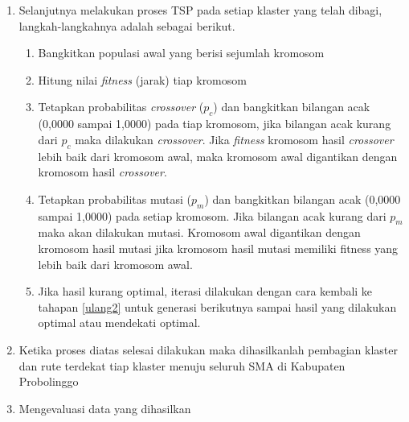 \begin{enumerate}
	\item Selanjutnya melakukan proses TSP pada setiap klaster yang telah dibagi, langkah-langkahnya adalah sebagai berikut.
	\begin{enumerate}
		\item Bangkitkan populasi awal yang berisi sejumlah kromosom
	    \item \label{ulang2} Hitung nilai \textit{fitness} (jarak) tiap kromosom
	    \item Tetapkan probabilitas \textit{crossover} ($p_c$) dan bangkitkan bilangan acak (0,0000 sampai 1,0000) pada tiap kromosom, jika bilangan acak kurang dari $p_c$ maka dilakukan \textit{crossover}. Jika \textit{fitness} kromosom hasil \textit{crossover} lebih baik dari kromosom awal, maka kromosom awal digantikan dengan kromosom hasil \textit{crossover}.
	    \item Tetapkan probabilitas mutasi ($p_m$) dan bangkitkan bilangan acak (0,0000 sampai 1,0000) pada setiap kromosom. Jika bilangan acak kurang dari $p_m$ maka akan dilakukan mutasi. Kromosom awal digantikan dengan kromosom hasil mutasi jika kromosom hasil mutasi memiliki fitness yang lebih baik dari kromosom awal.
	    \item Jika hasil kurang optimal, iterasi dilakukan dengan cara kembali ke tahapan \ref{ulang2} untuk generasi berikutnya sampai hasil yang dilakukan optimal atau mendekati optimal.
    \end{enumerate}
	\item Ketika proses diatas selesai dilakukan maka dihasilkanlah pembagian klaster dan rute terdekat tiap klaster menuju seluruh SMA di Kabupaten Probolinggo
	\item Mengevaluasi data yang dihasilkan
\end{enumerate}